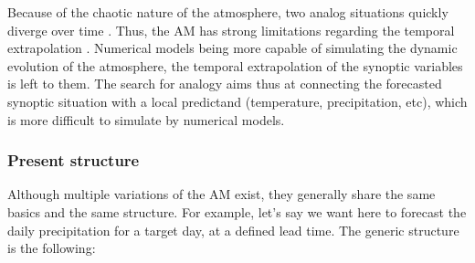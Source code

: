 \documentclass[review]{elsarticle}
\begin{document}
Because of the chaotic nature of the atmosphere, two analog situations quickly diverge over time \citep{Lorenz1969}. Thus, the AM has strong limitations regarding the temporal extrapolation \citep{Bontron2004}. Numerical models being more capable of simulating the dynamic evolution of the atmosphere, the temporal extrapolation of the synoptic variables is left to them. The search for analogy aims thus at connecting the forecasted synoptic situation with a local predictand (temperature, precipitation, etc), which is more difficult to simulate by numerical models.


\subsubsection{Present structure}

Although multiple variations of the AM exist, they generally share the same basics and the same structure. For example, let's say we want here to forecast the daily precipitation for a target day, at a defined lead time. The generic structure is the following:
\end{document}
